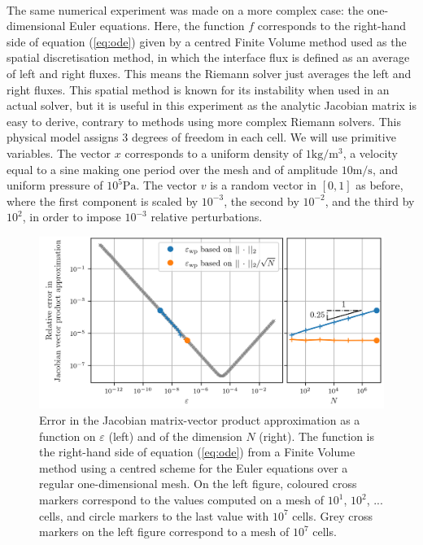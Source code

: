      \paragraph{}
      The same numerical experiment was made on a more complex case: the one-dimensional Euler equations.
      Here, the function $f$ corresponds to the right-hand side of equation (\ref{eq:ode}) given by a centred Finite Volume method used as the spatial discretisation method, in which the interface flux is defined as an average of left and right fluxes.
      This means the Riemann solver just averages the left and right fluxes.
      This spatial method is known for its instability when used in an actual solver, but it is useful in this experiment as the analytic Jacobian matrix is easy to derive, contrary to methods using more complex Riemann solvers.
      This physical model assigns 3 degrees of freedom in each cell.
      We will use primitive variables.
      The vector $x$ corresponds to a uniform density of $1\si{\kilogram\per\cubic\meter}$, a velocity equal to a sine making one period over the mesh and of amplitude $10\si{\meter\per\second}$, and uniform pressure of $10^5\si{\pascal}$.
      The vector $v$ is a random vector in $\left[0, 1\right]$ as before, where the first component is scaled by $10^{-3}$, the second by $10^{-2}$, and the third by $10^{2}$, in order to impose $10^{-3}$ relative perturbations.

      \begin{figure}
        \centering
        \includegraphics[width=\textwidth]{figures/epsilon_Euler.png}
        \caption{
          Error in the Jacobian matrix-vector product approximation as a function on $\varepsilon$ (left) and of the dimension $N$ (right).
          The function is the right-hand side of equation (\ref{eq:ode}) from a Finite Volume method using a centred scheme for the Euler equations over a regular one-dimensional mesh.
          On the left figure, coloured cross markers correspond to the values computed on a mesh of $10^1$, $10^2$, ... cells, and circle markers to the last value with $10^7$ cells.
          Grey cross markers on the left figure correspond to a mesh of $10^7$ cells.
        }
        \label{fig:epsilon_euler}
      \end{figure}

